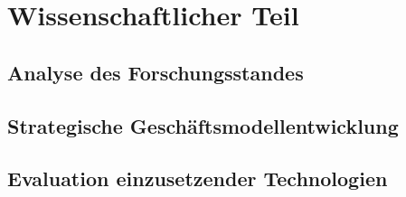 \newpage
\section{Wissenschaftlicher Teil}

\subsection{Analyse des Forschungsstandes}

\subsection{Strategische Geschäftsmodellentwicklung}

\subsection{Evaluation einzusetzender Technologien}

